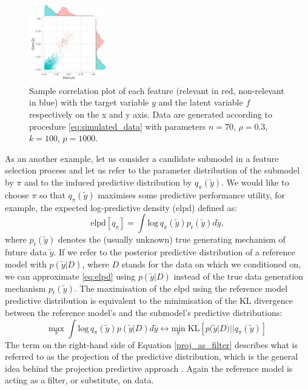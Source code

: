 \documentclass[american,]{article}
\theoremstyle{definition}
\begin{document}
\begin{figure}[tp]
  \centering
  \includegraphics[width=0.3\textwidth]{graphics/correlation.pdf}
  \caption{Sample correlation plot of each feature (relevant in red, non-relevant in blue) with the target variable $y$ and the latent variable $f$ respectively on the x and y axis. Data are generated according to procedure \eqref{eq:simulated_data} with parameters $n=70$, $\rho=0.3$, $k=100$, $p=1000$.\\}
  \label{fig:correlation}
\end{figure}

As an another example, let us consider a candidate submodel in a feature selection process and let us refer to the parameter distribution of the submodel by $\pi$ and to the induced predictive distribution by $q_{\pi}(\tilde{y})$. We would like to choose $\pi$ so that $q_{\pi}(\tilde{y})$ maximises some predictive performance utility, for example, the expected log-predictive density (elpd) defined as:
\
\begin{equation}\label{eq:elpd}
\text{elpd}[q_{\pi}]=\int \text{log}\,q_{\pi}(\tilde{y})p_{t}(\tilde{y})d\tilde{y},
\end{equation}
where $p_{t}(\tilde{y})$ denotes the (usually unknown) true generating mechanism of future data $\tilde{y}$. If we refer to the posterior predictive distribution of a reference model with $p(\tilde{y}|D)$, where $D$ stands for the data on which we conditioned on, we can approximate \eqref{eq:elpd} using $p(\tilde{y}|D)$ instead of the true data generation mechanism $p_{t}(\tilde{y})$. The maximisation of the elpd using the reference model predictive distribution is equivalent to the minimisation of the KL divergence between the reference model's and the submodel's predictive distributions:
\
\begin{equation} \label{proj_as_filter}
\underset{\pi}{\text{max}} \; \int \text{log}\,q_{\pi}(\tilde{y})p(\tilde{y}|D)d\tilde{y} \leftrightarrow \underset{\pi}{\text{min}} \; \text{KL}[p(\tilde{y}|D)||q_{\pi}(\tilde{y})] 
\end{equation}
The term on the right-hand side of Equation \eqref{proj_as_filter} describes what is referred to as the projection of the predictive distribution, which is the general idea behind the projection predictive approach \cite[see][]{paper:projpred}. Again the reference model is acting as a filter, or substitute, on data.
\end{document}
